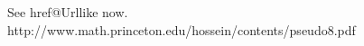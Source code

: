 \documentclass{article}
\begin{document}
See \csname href@Urllike now.
http://www.math.princeton.edu/\UrlTildeSpecial hossein/contents/pseudo8.pdf
\end{document}
